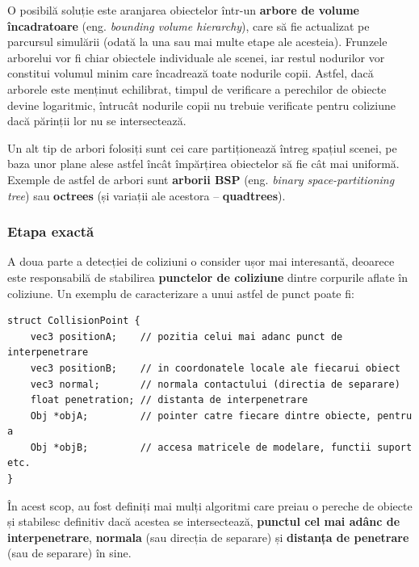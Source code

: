 \documentclass[12pt,a4paper]{report}
\begin{document}
O posibilă soluție este aranjarea obiectelor într-un \textbf{arbore de volume încadratoare} (eng. \textit{bounding volume hierarchy})\label{BVH}\cite{ericson_bvh}, care să fie actualizat pe parcursul simulării (odată la una sau mai multe etape ale acesteia). Frunzele arborelui vor fi chiar obiectele individuale ale scenei, iar restul nodurilor vor constitui volumul minim care încadrează toate nodurile copii. Astfel, dacă arborele este menținut echilibrat, timpul de verificare a perechilor de obiecte devine logaritmic, întrucât nodurile copii nu trebuie verificate pentru coliziune dacă părinții lor nu se intersectează.

\label{bsp}
Un alt tip de arbori folosiți sunt cei care partiționează întreg spațiul scenei, pe baza unor plane alese astfel încât împărțirea obiectelor să fie cât mai uniformă. Exemple de astfel de arbori sunt \textbf{arborii BSP} (eng. \textit{binary space-partitioning tree})\cite{ericson_bsp} sau \textbf{octrees} (și variații ale acestora -- \textbf{quadtrees})\cite{ericson_octrees}.

\subsubsection{Etapa exactă}
A doua parte a detecției de coliziuni o consider ușor mai interesantă, deoarece este responsabilă de stabilirea \textbf{punctelor de coliziune}\label{punct_coliziune} dintre corpurile aflate în coliziune. Un exemplu de caracterizare a unui astfel de punct poate fi:
\begin{lstlisting}[style=myC++, label = {code:CollisionPointExample}]
struct CollisionPoint {
	vec3 positionA;    // pozitia celui mai adanc punct de interpenetrare
	vec3 positionB;    // in coordonatele locale ale fiecarui obiect
	vec3 normal;       // normala contactului (directia de separare)
	float penetration; // distanta de interpenetrare
	Obj *objA;         // pointer catre fiecare dintre obiecte, pentru a
	Obj *objB;         // accesa matricele de modelare, functii suport etc.
}
\end{lstlisting}
În acest scop, au fost definiți mai mulți algoritmi care preiau o pereche de obiecte și stabilesc definitiv dacă acestea se intersectează, \textbf{punctul cel mai adânc de interpenetrare}, \textbf{normala} (sau direcția de separare) și \textbf{distanța de penetrare} (sau de separare) în sine.
\end{document}
